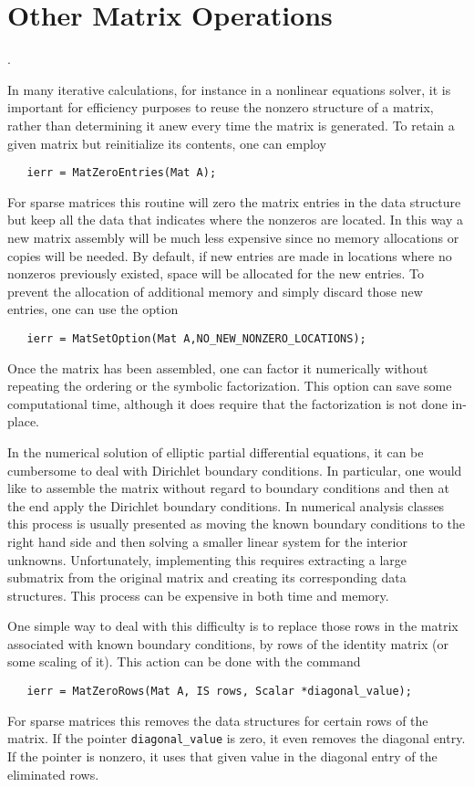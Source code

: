 \section{Other Matrix Operations}
\label{sec:othermat}.

In many iterative calculations, for instance in a nonlinear equations
solver, it is important for efficiency purposes to reuse the nonzero 
structure of a matrix, rather than determining it anew every time 
the matrix is generated.  To retain a given matrix but reinitialize
its contents, one can employ 
\begin{verbatim}
   ierr = MatZeroEntries(Mat A);
\end{verbatim}
For sparse matrices this routine will zero the matrix entries in the 
data structure but keep all the data that indicates where the nonzeros
are located.  In this way a new matrix assembly will be much less 
expensive since no memory allocations or copies will be needed. 
By default, if new entries are made in locations where no nonzeros 
previously existed, space will be allocated for the new entries. 
To prevent the allocation of additional memory and simply discard those 
new entries, one can use the option 
\begin{verbatim}
   ierr = MatSetOption(Mat A,NO_NEW_NONZERO_LOCATIONS);
\end{verbatim}
Once the matrix has been assembled, one can factor it numerically
without repeating the ordering or the symbolic factorization. 
This option can save some computational time, although it
does require that the factorization is not done in-place.

In the numerical solution of elliptic partial differential equations,
it can be cumbersome to deal with Dirichlet boundary 
 conditions. In
particular, one would like to assemble the matrix without regard to 
boundary conditions and then at the end apply the Dirichlet boundary 
conditions. 
In numerical analysis classes this process is usually presented as moving the 
known boundary conditions to the right hand side and then solving a smaller
linear system for the interior unknowns. Unfortunately, implementing this
requires extracting a large submatrix from the original matrix and 
creating its corresponding data structures. This process can be expensive 
in both time and memory. 

One simple way to deal with this difficulty is to replace those rows in the 
matrix associated with known boundary conditions, by rows of the 
identity matrix (or some scaling of it). This action can be done with 
the command 
\begin{verbatim}
   ierr = MatZeroRows(Mat A, IS rows, Scalar *diagonal_value);
\end{verbatim}
For sparse matrices this removes the data structures for certain rows 
of the matrix. If the pointer {\tt diagonal\_value} is zero, it 
even removes the diagonal entry. If the pointer is nonzero, it uses that 
given value in the diagonal entry of the eliminated rows. 

